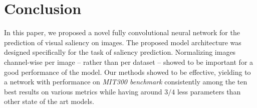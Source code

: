 \documentclass[10pt,twocolumn,letterpaper]{article}
\begin{document}
\section{Conclusion}
In this paper, we proposed a novel fully convolutional neural network for the
prediction of visual saliency on images.
The proposed model architecture was designed specifically
for the task of saliency prediction.
Normalizing images channel-wise per image -- rather than per dataset -- showed
to be important for a good performance of the model.
Our methods showed to be effective, yielding to a network with performance
on \emph{MIT300 benchmark} consistently among the ten best results on various
metrics while having around $3/4$  less parameters than other state of
the art models.

{\small


}
\end{document}
